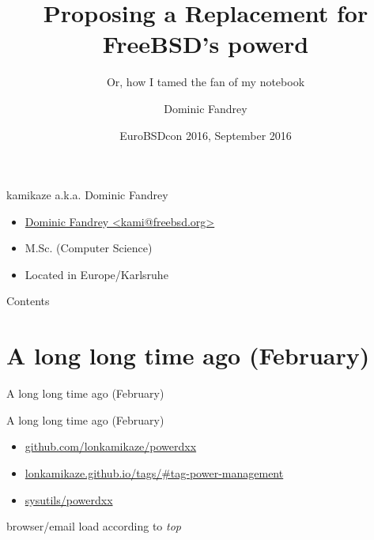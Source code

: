 \documentclass[aspectratio=169]{beamer}
\title{Proposing a Replacement for FreeBSD's powerd}
\subtitle{Or, how I tamed the fan of my notebook}
\author[D. Fandrey]{Dominic Fandrey}
\date[EuroBSDcon 2016]{EuroBSDcon 2016, September 2016}
\begin{document}
\begin{frame}[plain]
\titlepage
\end{frame}

\begin{frame}{kamikaze a.k.a. Dominic Fandrey}
\begin{itemize}
\item \href{mailto:kami@freebsd.org}{Dominic Fandrey <kami@freebsd.org>}
\item M.Sc. (Computer Science)
\item Located in Europe/Karlsruhe
\end{itemize}
\end{frame}

\begin{frame}{Contents}
\tableofcontents
\end{frame}

\section{A long long time ago (February)}

\begin{frame}{A long long time ago (February)}
\end{frame}

\begin{frame}{A long long time ago (February)}
\begin{itemize}
\item \href{https://github.com/lonkamikaze/powerdxx}{github.com/lonkamikaze/powerdxx}
\item \href{https://lonkamikaze.github.io/tags/\#tag-power-management}{lonkamikaze.github.io/tags/\#tag-power-management}
\item \href{https://www.freshports.org/sysutils/powerdxx}{sysutils/powerdxx}
\end{itemize}
\end{frame}

\begin{frame}{browser/email load according to \emph{top}}
\end{frame}
\end{document}

